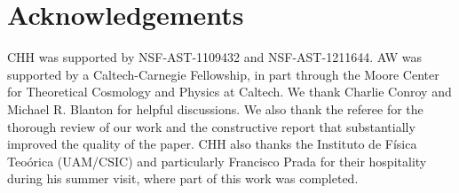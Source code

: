 
\section*{Acknowledgements}
CHH was supported by NSF-AST-1109432 and NSF-AST-1211644. 
AW was supported by a Caltech-Carnegie Fellowship, in part 
through the Moore Center for Theoretical Cosmology and Physics at Caltech.
We thank Charlie Conroy and Michael R. Blanton for helpful discussions. 
We also thank the referee for the thorough
review of our work and the constructive report that substantially 
improved the quality of the paper. 
CHH also thanks the Instituto  
de F\'{i}sica Teo\'{o}rica (UAM/CSIC) and particularly Francisco 
Prada for their hospitality during his summer visit, where part 
of this work was completed.
